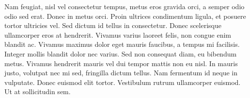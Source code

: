 Nam feugiat, nisl vel consectetur tempus, metus eros gravida orci, a semper odio odio sed erat. Donec in metus orci. Proin ultrices condimentum ligula, et posuere tortor ultricies vel. Sed dictum id tellus in consectetur. Donec scelerisque ullamcorper eros at hendrerit. Vivamus varius laoreet felis, non congue enim blandit ac. Vivamus maximus dolor eget mauris faucibus, a tempus mi facilisis. Integer mollis blandit dolor nec varius. Sed non consequat diam, eu bibendum metus. Vivamus hendrerit mauris vel dui tempor mattis non eu nisl. In mauris justo, volutpat nec mi sed, fringilla dictum tellus. Nam fermentum id neque in vulputate. Donec euismod elit tortor. Vestibulum rutrum ullamcorper euismod. Ut at sollicitudin sem.